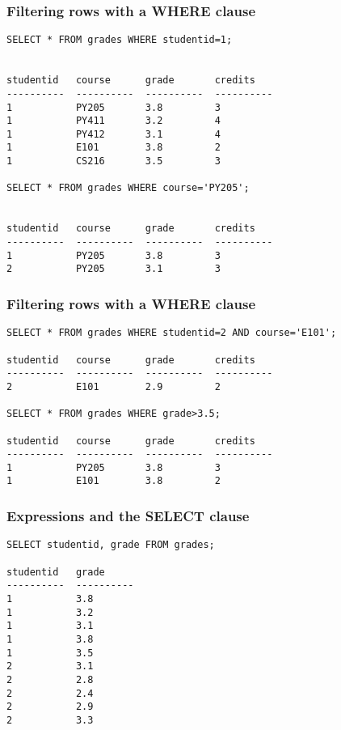 \begin{frame}[fragile] \frametitle{Filtering rows with a WHERE clause}
\begin{lstlisting}
SELECT * FROM grades WHERE studentid=1;


studentid   course      grade       credits   
----------  ----------  ----------  ----------
1           PY205       3.8         3         
1           PY411       3.2         4         
1           PY412       3.1         4         
1           E101        3.8         2         
1           CS216       3.5         3 

SELECT * FROM grades WHERE course='PY205';


studentid   course      grade       credits   
----------  ----------  ----------  ----------
1           PY205       3.8         3         
2           PY205       3.1         3  
\end{lstlisting}
\end{frame}

\begin{frame}[fragile] \frametitle{Filtering rows with a WHERE clause}
\begin{lstlisting}
SELECT * FROM grades WHERE studentid=2 AND course='E101';

studentid   course      grade       credits   
----------  ----------  ----------  ----------
2           E101        2.9         2  

SELECT * FROM grades WHERE grade>3.5;

studentid   course      grade       credits   
----------  ----------  ----------  ----------
1           PY205       3.8         3         
1           E101        3.8         2  
\end{lstlisting}
\end{frame}

\begin{frame}[fragile] \frametitle{Expressions and the SELECT clause}
\begin{lstlisting}
SELECT studentid, grade FROM grades;

studentid   grade     
----------  ----------
1           3.8       
1           3.2       
1           3.1       
1           3.8       
1           3.5       
2           3.1       
2           2.8       
2           2.4       
2           2.9       
2           3.3  
\end{lstlisting}
\end{frame}

